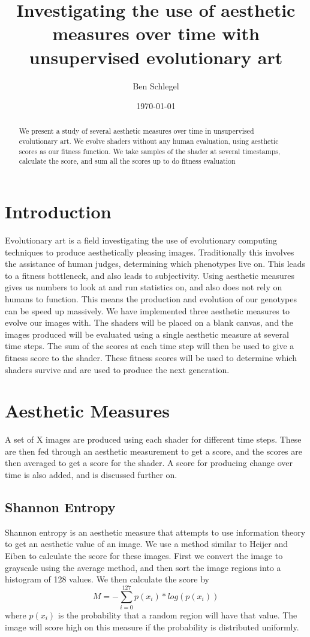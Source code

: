 \documentclass{article}
\title{Investigating the use of aesthetic measures over time with unsupervised evolutionary art}
\author{Ben Schlegel}
\date{\today}
\begin{document}
\begin{titlepage}
    \maketitle
\end{titlepage}
\begin{abstract}
    We present a study of several aesthetic measures over time in unsupervised evolutionary art. We evolve shaders without any human evaluation, using aesthetic scores as our fitness function. We take samples of the shader at several timestamps, calculate the score, and sum all the scores up to do fitness evaluation
\end{abstract}

\section*{Introduction}
Evolutionary art is a field investigating the use of evolutionary computing techniques to produce aesthetically pleasing images. Traditionally this involves the assistance of human judges, determining which phenotypes live on. This leads to a fitness bottleneck,
and also leads to subjectivity. Using aesthetic measures gives us numbers to look at and run statistics on, and also does not rely on humans to function. This means the production and evolution of our genotypes can be speed up massively. We have implemented three aesthetic measures to evolve our images with. The shaders will be placed on a blank canvas, and the images produced will be evaluated using a single aesthetic measure at several time steps. The sum of the scores at each time step will then be used to give a fitness score to the shader. These fitness scores will be used to determine which shaders 
survive and are used to produce the next generation.


\section*{Aesthetic Measures}
A set of X images are produced using each shader for different time steps. These are then fed through an aesthetic measurement to get a score, and the scores are then averaged to get a score for the shader. A score for producing change over time is also added, and is discussed further on.
\subsection*{Shannon Entropy}
Shannon entropy is an aesthetic measure that attempts to use information theory to get an aesthetic value of an image. We use a method similar to Heijer and Eiben to calculate the score for these images. 
First we convert the image to grayscale using the average method, and then sort the image regions into a histogram of 128 values. We then calculate the score by
\begin{equation*}
    M = - \sum_{i=0}^{127} p(x_i) * log(p(x_i))
\end{equation*}
where $p(x_i)$ is the probability that a random region will have that value. The image will score high on this measure if the probability is distributed uniformly.
\end{document}
